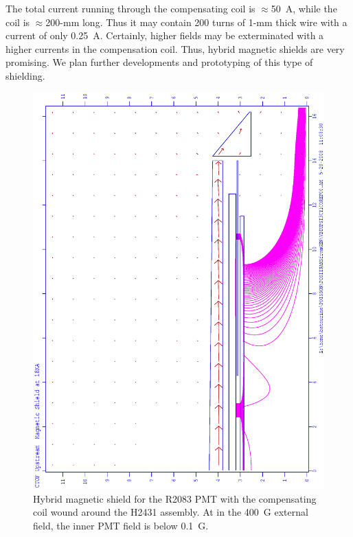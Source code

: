 The total current running through the compensating coil is  $\approx$50~A, while the 
coil is $\approx$200-mm long.  Thus it may contain 200 turns of 1-mm thick wire with 
a current of only 0.25~A.  Certainly, higher fields may be exterminated with a higher 
currents in the compensation coil.  Thus, hybrid magnetic shields are very promising. 
We plan further developments and prototyping of this type of shielding.

\begin{figure}[htbp]
\centering
\includegraphics[width=.6\textwidth]{VBTUPST3CY1COREF0001.eps}
\caption{\small{Hybrid magnetic shield for the R2083 PMT with the compensating coil
wound around the H2431 assembly.  At in the 400~G external field, the inner PMT field  
is below 0.1~G.}}
\label{VBT3CYUS1}
\end{figure}

